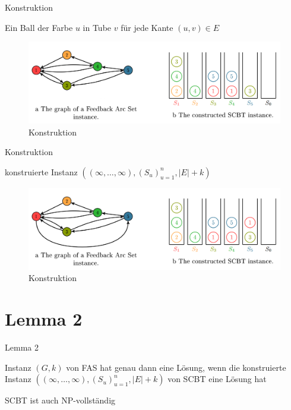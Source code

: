 \documentclass{beamer}
\begin{document}
\begin{frame}{Konstruktion}
\begin{pointlist}
\item Ein Ball der Farbe $u$ in Tube $v$ für jede Kante $(u,v)\in E$
\end{pointlist}
\begin{figure}[ht]
		\includegraphics[width=\textwidth]{construct01}
		\caption{Konstruktion}
    \end{figure}
\end{frame}

\begin{frame}{Konstruktion}
\begin{pointlist}
\item konstruierte Instanz $((\infty, \dots, \infty), (S_u)_{u=1}^n, |E|+k)$
\end{pointlist}
\begin{figure}[ht]
		\includegraphics[width=\textwidth]{construct}
		\caption{Konstruktion}
    \end{figure}
\end{frame}

\section*{Lemma 2}
\begin{frame}{Lemma 2}
\begin{pointlist}
\item Instanz $(G,k)$ von FAS hat genau dann eine Lösung, wenn die konstruierte Instanz $((\infty, \dots, \infty), (S_u)_{u=1}^n, |E|+k)$ von SCBT eine Lösung hat
\begin{arrowlist}
\item SCBT ist auch NP-vollständig
\end{arrowlist}
\end{pointlist}
\end{frame}
\end{document}
